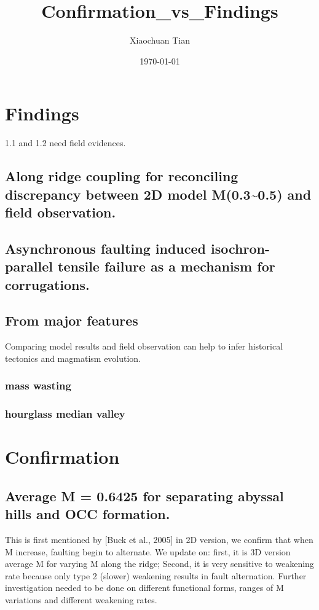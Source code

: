 \documentclass[11pt]{article}
\author{Xiaochuan Tian}
\date{\today}
\title{Confirmation\_vs\_Findings}
\begin{document}
\maketitle
\tableofcontents

\section{Findings}
\label{sec-1}
1.1 and 1.2 need field evidences. 
\subsection{Along ridge coupling for reconciling discrepancy between 2D model M(0.3\textasciitilde{}0.5) and field observation.}
\label{sec-1-1}
\subsection{Asynchronous faulting induced isochron-parallel tensile failure as a mechanism for corrugations.}
\label{sec-1-2}

\subsection{From major features}
\label{sec-1-3}
Comparing model results and field observation can help to infer historical tectonics and magmatism evolution.
\subsubsection{mass wasting}
\label{sec-1-3-1}
\subsubsection{hourglass median valley}
\label{sec-1-3-2}
\section{Confirmation}
\label{sec-2}
\subsection{Average M = 0.6425 for separating abyssal hills and OCC formation.}
\label{sec-2-1}
This is first mentioned by [Buck et al., 2005] in 2D version, we confirm that when M increase, faulting begin to alternate. 
We update on: first, it is 3D version average M for varying M along the ridge; Second, it is very sensitive to weakening rate because only type 2 (slower) weakening results in fault alternation. Further investigation needed to be done on different functional forms, ranges of M variations and different weakening rates. 
\end{document}
